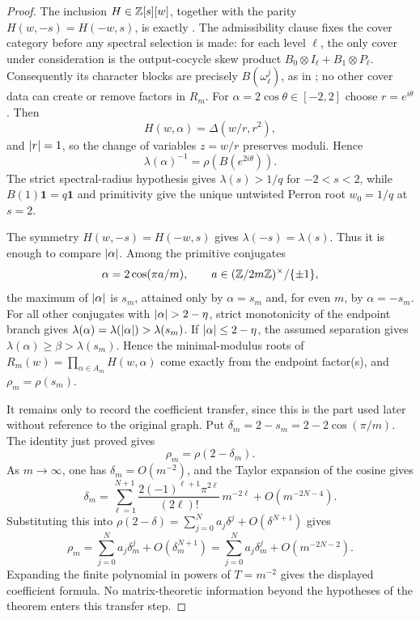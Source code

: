 \begin{proof}

The inclusion \(H\in\mathbb{Z}[s][w]\), together with the parity
\(H(w,-s)=H(-w,s)\), is exactly . The
admissibility clause fixes the cover category before any spectral
selection is made: for each level \(\ell\), the only cover under consideration is
the output-cocycle skew product \(B_0\otimes I_\ell+B_1\otimes P_\ell\).
Consequently its character blocks are precisely \(B(\omega_\ell^j)\), as
in ; no other cover data can
create or remove factors in \(R_m\).
For \(\alpha=2\cos\theta\in[-2,2]\)
choose \(r=e^{i\theta}\). Then
\[
  H(w,\alpha)=\Delta(w/r,r^2),
\]
and \(\lvert r \rvert=1\), so the change of variables \(z=w/r\) preserves
moduli. Hence
\[
  \lambda(\alpha)^{-1}=\rho(B(e^{2i\theta})).
  \]
The strict spectral-radius hypothesis gives \(\lambda(s)>1/q\) for
\(-2<s<2\), while \(B(1)\mathbf1=q\mathbf1\) and primitivity give the
unique untwisted Perron root \(w_0=1/q\) at \(s=2\).

The symmetry \(H(w,-s)=H(-w,s)\) gives \(\lambda(-s)=\lambda(s)\).
Thus it is enough to compare \(\lvert \alpha \rvert\). Among the primitive
conjugates
\[
  \alpha=2\cos(\pi a/m),
  \qquad a\in(\mathbb{Z}/2m\mathbb{Z})^\times/\{\pm1\},
\]
the maximum of \(\lvert \alpha \rvert\) is \(s_m\), attained only by
\(\alpha=s_m\) and, for even \(m\), by \(\alpha=-s_m\). For all other
conjugates with \(\lvert \alpha \rvert>2-\eta\), strict monotonicity of the
endpoint branch gives \(\lambda(\alpha)=\lambda(\lvert \alpha \rvert)
>\lambda(s_m)\). If \(\lvert \alpha \rvert\le2-\eta\), the assumed separation
gives \(\lambda(\alpha)\ge\beta>\lambda(s_m)\). Hence the
minimal-modulus roots of \(R_m(w)=\prod_{\alpha\in A_m}H(w,\alpha)\)
come exactly from the endpoint factor(s), and
\(\rho_m=\rho(s_m)\).

  It remains only to record the coefficient transfer, since this is the
  part used later without reference to the original graph. Put
  \(\delta_m=2-s_m=2-2\cos(\pi/m)\). The identity just proved gives
\[
  \rho_m=\rho(2-\delta_m).
\]
As \(m\to\infty\), one has \(\delta_m=O(m^{-2})\), and the Taylor
expansion of the cosine gives
\[
  \delta_m
  =\sum_{\ell=1}^{N+1}
    \frac{2(-1)^{\ell+1}\pi^{2\ell}}{(2\ell)!}\,m^{-2\ell}
    +O(m^{-2N-4}).
\]
Substituting this into
\(\rho(2-\delta)=\sum_{j=0}^N a_j\delta^j+O(\delta^{N+1})\) gives
\[
  \rho_m
  =\sum_{j=0}^N a_j\delta_m^j+O(\delta_m^{N+1})
  =\sum_{j=0}^N a_j\delta_m^j+O(m^{-2N-2}).
\]
Expanding the finite polynomial in powers of \(T=m^{-2}\) gives the
displayed coefficient formula. No matrix-theoretic information beyond
the hypotheses of the theorem enters this transfer step.

\end{proof}

